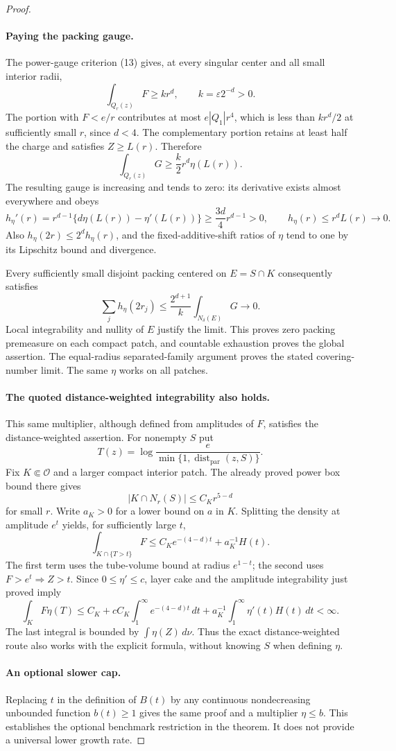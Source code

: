 \documentclass[11pt]{article}
\begin{document}
\begin{proof}
\paragraph{Paying the packing gauge.}
The power-gauge criterion (13) gives, at every singular center and all small interior radii,
$$
\int_{Q_r(z)}F\ge k r^d,\qquad k=\varepsilon2^{-d}>0.
$$
The portion with $F<e/r$ contributes at most $e|Q_1|r^4$, which is less than $kr^d/2$ at sufficiently small $r$, since $d<4$. The complementary portion retains at least half the charge and satisfies $Z\ge L(r)$. Therefore
$$
\int_{Q_r(z)}G
\ge\frac{k}{2}r^d\eta(L(r)).
$$
The resulting gauge is increasing and tends to zero: its derivative exists almost everywhere and obeys
$$
h_\eta'(r)=r^{d-1}\{d\eta(L(r))-\eta'(L(r))\}
\ge\frac{3d}{4}r^{d-1}>0,
\qquad h_\eta(r)\le r^dL(r)\longrightarrow0.
$$
Also $h_\eta(2r)\le2^dh_\eta(r)$, and the fixed-additive-shift ratios of $\eta$ tend to one by its Lipschitz bound and divergence.

Every sufficiently small disjoint packing centered on $E=S\cap K$ consequently satisfies
$$
\sum_jh_\eta(2r_j)
\le\frac{2^{d+1}}{k}\int_{N_\delta(E)}G\longrightarrow0.
$$
Local integrability and nullity of $E$ justify the limit. This proves zero packing premeasure on each compact patch, and countable exhaustion proves the global assertion. The equal-radius separated-family argument proves the stated covering-number limit. The same $\eta$ works on all patches.

\paragraph{The quoted distance-weighted integrability also holds.}
This same multiplier, although defined from amplitudes of $F$, satisfies the distance-weighted assertion. For nonempty $S$ put
$$
T(z)=\log\frac{e}{\min\{1,\operatorname{dist}_{\mathrm{par}}(z,S)\}}.
$$
Fix $K\Subset\mathcal O$ and a larger compact interior patch. The already proved power box bound there gives
$$
|K\cap N_r(S)|\le C_Kr^{5-d}
$$
for small $r$. Write $a_K>0$ for a lower bound on $a$ in $K$. Splitting the density at amplitude $e^t$ yields, for sufficiently large $t$,
$$
\int_{K\cap\{T>t\}}F
\le C_Ke^{-(4-d)t}+a_K^{-1}H(t).
$$
The first term uses the tube-volume bound at radius $e^{1-t}$; the second uses $F>e^t\Rightarrow Z>t$. Since $0\le\eta'\le c$, layer cake and the amplitude integrability just proved imply
$$
\int_KF\eta(T)
\le C_K+cC_K\int_1^\infty e^{-(4-d)t}\,dt
+a_K^{-1}\int_1^\infty\eta'(t)H(t)\,dt<\infty.
$$
The last integral is bounded by $\int\eta(Z)\,d\nu$. Thus the exact distance-weighted route also works with the explicit formula, without knowing $S$ when defining $\eta$.

\paragraph{An optional slower cap.}
Replacing $t$ in the definition of $B(t)$ by any continuous nondecreasing unbounded function $b(t)\ge1$ gives the same proof and a multiplier $\eta\le b$. This establishes the optional benchmark restriction in the theorem. It does not provide a universal lower growth rate.
\end{proof}
\end{document}
